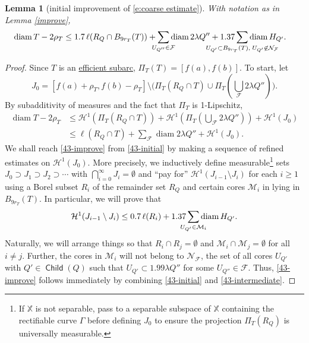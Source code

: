 \documentclass[12pt]{amsart}
\numberwithin{equation}{section}
\theoremstyle{plain}
\newtheorem{lemma}[theorem]{Lemma}
\theoremstyle{definition}
\def\XX{{\mathbb{X}}}
\newcommand{\diam}{\mathop\mathrm{diam}\nolimits}
\newcommand{\Haus}{\mathcal{H}}
\newcommand{\Child}{\mathop\mathsf{Child}\nolimits}
\numberwithin{figure}{section}
\begin{document}
\begin{lemma}[initial improvement of \eqref{e:coarse estimate}] \label{43-estimate} With notation as in Lemma \ref{improve},
\begin{equation}\begin{split} \label{43-improve}
   \diam T-2\rho_T\leq 1.7\,\ell(R_Q&\cap B_{9r_T}(T)) + \sum_{\mathclap{U_{Q''}\in \mathcal{F}}} \diam 2\lambda Q'' + 1.37 \sum_{\mathclap{U_{Q'}\subset B_{9r_T}(T),\;U_{Q'}\not\in\mathcal{N}_\mathcal{F}}} \diam H_{Q'}.
\end{split}\end{equation}\end{lemma}

\begin{proof} Since $T$ is an \hyperref[def:subarc]{efficient subarc}, $\Pi_T(T)=[f(a),f(b)]$. To start, let \begin{equation}J_0=[f(a)+\rho_T,f(b)-\rho_T]\setminus \Big(\Pi_T(R_Q \cap T) \cup \Pi_T(\textstyle\bigcup_{\mathcal{F}}2\lambda Q'')\Big).\end{equation} By subadditivity of measures and the fact that $\Pi_T$ is 1-Lipschitz, \begin{equation}\begin{split} \label{43-initial} \diam T-2\rho_T & \leq \Haus^1(\Pi_T(R_Q \cap T)) + \Haus^1(\Pi_T(\textstyle\bigcup_{\mathcal{F}}2\lambda Q'')) + \Haus^1(J_0) \\ & \leq \ell(R_Q \cap T) + \sum_{\mathcal{F}} \diam 2\lambda Q'' + \Haus^1(J_0).\end{split}\end{equation}  We shall reach \eqref{43-improve} from \eqref{43-initial} by making a sequence of refined estimates on $\Haus^1(J_0)$. More precisely, we inductively define measurable\footnote{If $\XX$ is not separable, pass to a separable subspace of $\XX$ containing the rectifiable curve $\Gamma$ before defining $J_0$ to ensure the projection $\Pi_T(R_Q)$ is universally measurable.} sets $J_0\supset J_1\supset J_2\supset \cdots$ with $\bigcap_{i=0}^\infty J_i=\emptyset$ and ``pay for'' $\Haus^1(J_{i-1}\setminus J_{i})$ for each $i\geq 1$ using a Borel subset $R_i$ of the remainder set $R_Q$ and certain cores $\mathcal{M}_i$ in lying in $B_{9r_T}(T)$. In particular, we will prove that \begin{equation}\label{43-intermediate} \Haus^1(J_{i-1}\setminus J_{i}) \leq 0.7\,\ell(R_i) + 1.37\sum_{\mathclap{U_{Q'}\in \mathcal{M}_i}} \diam H_{Q'}.\end{equation} Naturally, we will arrange things so that $R_i\cap R_j=\emptyset$ and $\mathcal{M}_i\cap\mathcal{M}_j=\emptyset$ for all $i\neq j$. Further, the cores in $\mathcal{M}_i$ will not belong to $\mathcal{N}_\mathcal{F}$, the set of all cores $U_{Q'}$ with $Q'\in\Child(Q)$ such that $U_{Q'}\subset 1.99\lambda Q''$ for some $U_{Q''}\in\mathcal{F}$. Thus, \eqref{43-improve} follows immediately by combining \eqref{43-initial} and \eqref{43-intermediate}.


\end{proof}
\end{document}

